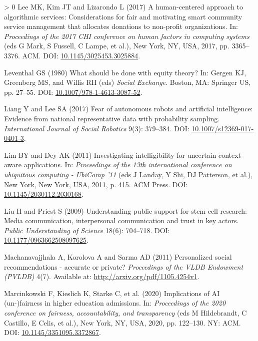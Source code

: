\documentclass{article}
\newlength{\cslhangindent}
\newenvironment{CSLReferences}[3] %
 {%
  \setlength{\parindent}{0pt}
  \ifodd #1 \everypar{\setlength{\hangindent}{\cslhangindent}}\ignorespaces\fi
  \ifnum #2 > 0
  \setlength{\parskip}{#2\baselineskip}
  \fi
 }%
 {}
\begin{document}
\begin{CSLReferences}{1}{0}
\leavevmode\hypertarget{ref-Lee.2017}{}%
Lee MK, Kim JT and Lizarondo L (2017) A human-centered approach to
algorithmic services: Considerations for fair and motivating smart
community service management that allocates donations to non-profit
organizations. In: \emph{Proceedings of the 2017 CHI conference on human
factors in computing systems} (eds G Mark, S Fussell, C Lampe, et al.),
New York, NY, USA, 2017, pp. 3365--3376. ACM. DOI:
\href{https://doi.org/10.1145/3025453.3025884}{10.1145/3025453.3025884}.

\leavevmode\hypertarget{ref-Leventhal.1980}{}%
Leventhal GS (1980) What should be done with equity theory? In: Gergen
KJ, Greenberg MS, and Willis RH (eds) \emph{Social Exchange}. Boston,
MA: {Springer US}, pp. 27--55. DOI:
\href{https://doi.org/10.1007/978-1-4613-3087-52}{10.1007/978-1-4613-3087-52}.

\leavevmode\hypertarget{ref-Liang.2017}{}%
Liang Y and Lee SA (2017) Fear of autonomous robots and artificial
intelligence: Evidence from national representative data with
probability sampling. \emph{International Journal of Social Robotics}
9(3): 379--384. DOI:
\href{https://doi.org/10.1007/s12369-017-0401-3}{10.1007/s12369-017-0401-3}.

\leavevmode\hypertarget{ref-Lim.2011}{}%
Lim BY and Dey AK (2011) Investigating intelligibility for uncertain
context-aware applications. In: \emph{Proceedings of the 13th
international conference on ubiquitous computing - UbiComp '11} (eds J
Landay, Y Shi, DJ Patterson, et al.), New York, New York, USA, 2011, p.
415. {ACM Press}. DOI:
\href{https://doi.org/10.1145/2030112.2030168}{10.1145/2030112.2030168}.

\leavevmode\hypertarget{ref-Liu.2009}{}%
Liu H and Priest S (2009) Understanding public support for stem cell
research: Media communication, interpersonal communication and trust in
key actors. \emph{Public Understanding of Science} 18(6): 704--718. DOI:
\href{https://doi.org/10.1177/0963662508097625}{10.1177/0963662508097625}.

\leavevmode\hypertarget{ref-Machanavajjhala.2011}{}%
Machanavajjhala A, Korolova A and Sarma AD (2011) Personalized social
recommendations - accurate or private? \emph{Proceedings of the VLDB
Endowment (PVLDB)} 4(7). Available at:
\url{http://arxiv.org/pdf/1105.4254v1}.

\leavevmode\hypertarget{ref-Marcinkowski.2020}{}%
Marcinkowski F, Kieslich K, Starke C, et al. (2020) Implications of AI
(un-)fairness in higher education admissions. In: \emph{Proceedings of
the 2020 conference on fairness, accountability, and transparency} (eds
M Hildebrandt, C Castillo, E Celis, et al.), New York, NY, USA, 2020,
pp. 122--130. {NY: ACM}. DOI:
\href{https://doi.org/10.1145/3351095.3372867}{10.1145/3351095.3372867}.


\end{CSLReferences}
\end{document}
